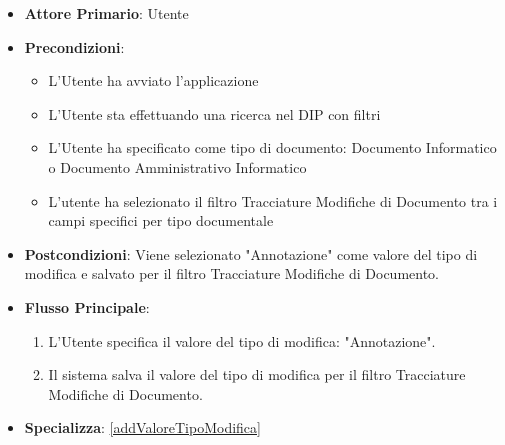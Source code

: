 \begin{itemize}
      \item \textbf{Attore Primario}: Utente
      \item \textbf{Precondizioni}: 
      \begin{itemize}            
            \item L'Utente ha avviato l'applicazione
            \item L'Utente sta effettuando una ricerca nel DIP con filtri
            \item L'Utente ha specificato come tipo di documento: Documento Informatico o Documento Amministrativo Informatico
            \item L'utente ha selezionato il filtro Tracciature Modifiche di Documento tra i campi specifici per tipo documentale
      \end{itemize}
      \item \textbf{Postcondizioni}: Viene selezionato "Annotazione" come valore del tipo di modifica e salvato per il filtro Tracciature Modifiche di Documento.
      \item \textbf{Flusso Principale}:
            \begin{enumerate}
                  \item L'Utente specifica il valore del tipo di modifica: "Annotazione".
                  \item Il sistema salva il valore del tipo di modifica per il filtro Tracciature Modifiche di Documento.
            \end{enumerate}
      \item \textbf{Specializza}: \ref{addValoreTipoModifica}
\end{itemize}

